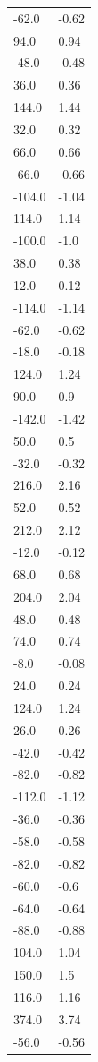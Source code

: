 \begin{longtable}{ll}
-62.0 & -0.62 \\
94.0 & 0.94 \\
-48.0 & -0.48 \\
36.0 & 0.36 \\
144.0 & 1.44 \\
32.0 & 0.32 \\
66.0 & 0.66 \\
-66.0 & -0.66 \\
-104.0 & -1.04 \\
114.0 & 1.14 \\
-100.0 & -1.0 \\
38.0 & 0.38 \\
12.0 & 0.12 \\
-114.0 & -1.14 \\
-62.0 & -0.62 \\
-18.0 & -0.18 \\
124.0 & 1.24 \\
90.0 & 0.9 \\
-142.0 & -1.42 \\
50.0 & 0.5 \\
-32.0 & -0.32 \\
216.0 & 2.16 \\
52.0 & 0.52 \\
212.0 & 2.12 \\
-12.0 & -0.12 \\
68.0 & 0.68 \\
204.0 & 2.04 \\
48.0 & 0.48 \\
74.0 & 0.74 \\
-8.0 & -0.08 \\
24.0 & 0.24 \\
124.0 & 1.24 \\
26.0 & 0.26 \\
-42.0 & -0.42 \\
-82.0 & -0.82 \\
-112.0 & -1.12 \\
-36.0 & -0.36 \\
-58.0 & -0.58 \\
-82.0 & -0.82 \\
-60.0 & -0.6 \\
-64.0 & -0.64 \\
-88.0 & -0.88 \\
104.0 & 1.04 \\
150.0 & 1.5 \\
116.0 & 1.16 \\
374.0 & 3.74 \\
-56.0 & -0.56 \\

\end{longtable}
